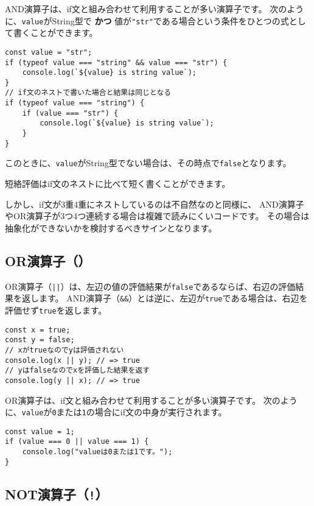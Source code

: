 AND演算子は、if文と組み合わせて利用することが多い演算子です。
次のように、\texttt{value}がString型で \textbf{かつ}
値が\texttt{"str"}である場合という条件をひとつの式として書くことができます。

\begin{lstlisting}
const value = "str";
if (typeof value === "string" && value === "str") {
    console.log(`${value} is string value`);
}
// if文のネストで書いた場合と結果は同じとなる
if (typeof value === "string") {
    if (value === "str") {
        console.log(`${value} is string value`);
    }
}
\end{lstlisting}

このときに、\texttt{value}がString型でない場合は、その時点で\texttt{false}となります。

短絡評価はif文のネストに比べて短く書くことができます。

しかし、if文が3重4重にネストしているのは不自然なのと同様に、
AND演算子やOR演算子が3つ4つ連続する場合は複雑で読みにくいコードです。
その場合は抽象化ができないかを検討するべきサインとなります。

\hypertarget{or-operator}{%
\subsection{\texorpdfstring{OR演算子（\texttt{\textbar{}\textbar{}}）}{OR演算子（\textbar{}\textbar{}）}}\label{or-operator}}

OR演算子（\texttt{||}）は、左辺の値の評価結果が\texttt{false}であるならば、右辺の評価結果を返します。
AND演算子（\texttt{\&\&}）とは逆に、左辺が\texttt{true}である場合は、右辺を評価せず\texttt{true}を返します。

\begin{lstlisting}
const x = true;
const y = false;
// xがtrueなのでyは評価されない
console.log(x || y); // => true
// yはfalseなのでxを評価した結果を返す
console.log(y || x); // => true
\end{lstlisting}

OR演算子は、if文と組み合わせて利用することが多い演算子です。
次のように、\texttt{value}が\texttt{0}または\texttt{1}の場合にif文の中身が実行されます。

\begin{lstlisting}
const value = 1;
if (value === 0 || value === 1) {
    console.log("valueは0または1です。");
}
\end{lstlisting}

\hypertarget{not-operator}{%
\subsection{\texorpdfstring{NOT演算子（\texttt{!}）}{NOT演算子（!）}}\label{not-operator}}


